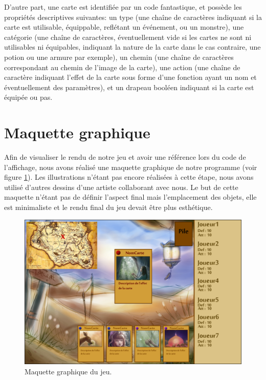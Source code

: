 \documentclass[12pt]{report}
\begin{document}
		D'autre part, une carte est identifiée par un code fantastique, et possède les propriétés descriptives suivantes: un type (une chaîne de caractères indiquant si la carte est utilisable, équippable, reflétant un événement, ou un monstre), une catégorie (une chaîne de caractères, éventuellement vide si les cartes ne sont ni utilisables ni équipables, indiquant la nature de la carte dans le cas contraire, une potion ou une armure par exemple), un chemin (une chaîne de caractères correspondant au chemin de l'image de la carte), une action (une chaîne de caractère indiquant l'effet de la carte sous forme d'une fonction ayant un nom et éventuellement des paramètres), et un drapeau booléen indiquant si la carte est équipée ou pas.

    \section{Maquette graphique}

    Afin de visualiser le rendu de notre jeu et avoir une référence lors du code de l'affichage, nous avons réalisé une maquette graphique de notre programme (voir figure \ref{fig:maquette}). Les illustrations n'étant pas encore réalisées à cette étape, nous avons utilisé d'autres dessins d'une artiste collaborant avec nous. Le but de cette maquette n'étant pas de définir l'aspect final mais l'emplacement des objets, elle est minimaliste et le rendu final du jeu devait être plus esthétique.\\[1.5cm]

    \begin{figure}[h!]
    	\centering
	    \includegraphics[scale=2.8]{mock-up.png}
	    \caption{Maquette graphique du jeu.}
	    \label{fig:maquette}
    \end{figure}
\end{document}
